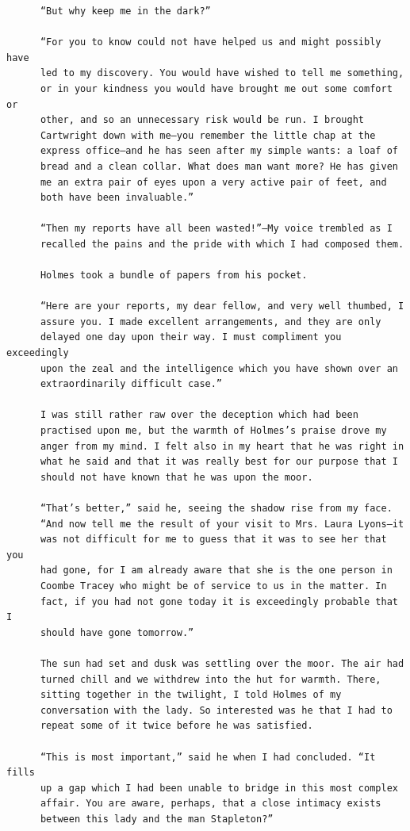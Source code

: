 \documentclass{article}
\begin{document}
\begin{verbatim}
      “But why keep me in the dark?”

      “For you to know could not have helped us and might possibly have
      led to my discovery. You would have wished to tell me something,
      or in your kindness you would have brought me out some comfort or
      other, and so an unnecessary risk would be run. I brought
      Cartwright down with me—you remember the little chap at the
      express office—and he has seen after my simple wants: a loaf of
      bread and a clean collar. What does man want more? He has given
      me an extra pair of eyes upon a very active pair of feet, and
      both have been invaluable.”

      “Then my reports have all been wasted!”—My voice trembled as I
      recalled the pains and the pride with which I had composed them.

      Holmes took a bundle of papers from his pocket.

      “Here are your reports, my dear fellow, and very well thumbed, I
      assure you. I made excellent arrangements, and they are only
      delayed one day upon their way. I must compliment you exceedingly
      upon the zeal and the intelligence which you have shown over an
      extraordinarily difficult case.”

      I was still rather raw over the deception which had been
      practised upon me, but the warmth of Holmes’s praise drove my
      anger from my mind. I felt also in my heart that he was right in
      what he said and that it was really best for our purpose that I
      should not have known that he was upon the moor.

      “That’s better,” said he, seeing the shadow rise from my face.
      “And now tell me the result of your visit to Mrs. Laura Lyons—it
      was not difficult for me to guess that it was to see her that you
      had gone, for I am already aware that she is the one person in
      Coombe Tracey who might be of service to us in the matter. In
      fact, if you had not gone today it is exceedingly probable that I
      should have gone tomorrow.”

      The sun had set and dusk was settling over the moor. The air had
      turned chill and we withdrew into the hut for warmth. There,
      sitting together in the twilight, I told Holmes of my
      conversation with the lady. So interested was he that I had to
      repeat some of it twice before he was satisfied.

      “This is most important,” said he when I had concluded. “It fills
      up a gap which I had been unable to bridge in this most complex
      affair. You are aware, perhaps, that a close intimacy exists
      between this lady and the man Stapleton?”


\end{verbatim}
\end{document}
